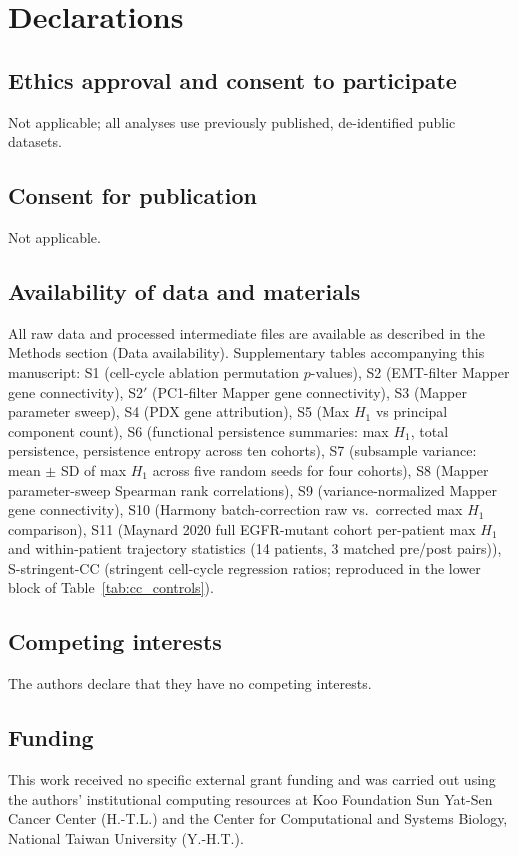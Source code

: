 \section*{Declarations}

\subsection*{Ethics approval and consent to participate}
Not applicable; all analyses use previously published, de-identified
public datasets.

\subsection*{Consent for publication}
Not applicable.

\subsection*{Availability of data and materials}
All raw data and processed intermediate files are available as
described in the Methods section (Data availability).
Supplementary tables accompanying this manuscript:
S1 (cell-cycle ablation permutation $p$-values),
S2 (EMT-filter Mapper gene connectivity),
S2$'$ (PC1-filter Mapper gene connectivity),
S3 (Mapper parameter sweep),
S4 (PDX gene attribution),
S5 (Max $H_1$ vs principal component count),
S6 (functional persistence summaries: max $H_1$, total persistence,
persistence entropy across ten cohorts),
S7 (subsample variance: mean $\pm$ SD of max $H_1$ across five random
seeds for four cohorts),
S8 (Mapper parameter-sweep Spearman rank correlations),
S9 (variance-normalized Mapper gene connectivity),
S10 (Harmony batch-correction raw vs.~corrected max $H_1$ comparison),
S11 (Maynard 2020 full EGFR-mutant cohort per-patient max $H_1$ and within-patient trajectory statistics (14 patients, 3 matched pre/post pairs)),
S-stringent-CC (stringent cell-cycle regression ratios; reproduced in
the lower block of Table~\ref{tab:cc_controls}).

\subsection*{Competing interests}
The authors declare that they have no competing interests.

\subsection*{Funding}
This work received no specific external grant funding and was carried
out using the authors' institutional computing resources at Koo
Foundation Sun Yat-Sen Cancer Center (H.-T.L.) and the Center for
Computational and Systems Biology, National Taiwan University
(Y.-H.T.).

